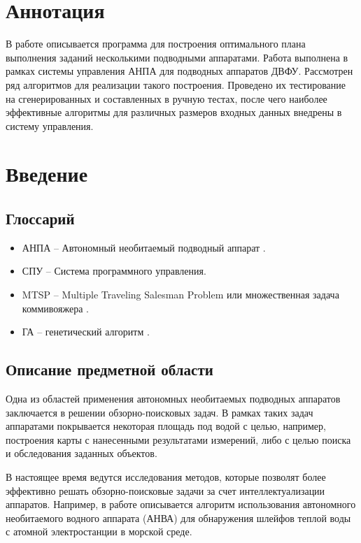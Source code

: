 \documentclass[a4paper,14pt,russian]{article}
\begin{document}
\tableofcontents
\newpage

\section*{Аннотация}

В работе описывается программа для построения оптимального плана выполнения заданий несколькими подводными аппаратами. Работа выполнена в рамках системы управления АНПА для подводных аппаратов ДВФУ. Рассмотрен ряд алгоритмов для реализации такого построения. Проведено их тестирование на сгенерированных и составленных в ручную тестах, после чего наиболее эффективные алгоритмы для различных размеров входных данных внедрены в систему управления.

\section{Введение}
\subsection{Глоссарий}
\begin{itemize}
\item АНПА -- Автономный необитаемый подводный аппарат \cite{auv}.
\item СПУ -- Система программного управления.
\item MTSP -- Multiple Traveling Salesman Problem или множественная задача коммивояжера \cite{bektas2006multiple}.
\item ГА -- генетический алгоритм \cite{ga}.
\end{itemize}

\subsection{Описание предметной области}

Одна из областей применения автономных необитаемых подводных аппаратов заключается в решении обзорно-поисковых задач. В рамках таких задач аппаратами покрывается некоторая площадь под водой с целью, например, построения карты с нанесенными результатами измерений, либо с целью поиска и обследования заданных объектов.

В настоящее время ведутся исследования методов, которые позволят более эффективно решать обзорно-поисковые задачи за счет интеллектуализации аппаратов.
Например, в работе \cite{cannell2006boundary} описывается алгоритм использования автономного необитаемого водного аппарата (АНВА) для обнаружения шлейфов теплой воды с атомной электростанции в морской среде.
\end{document}
